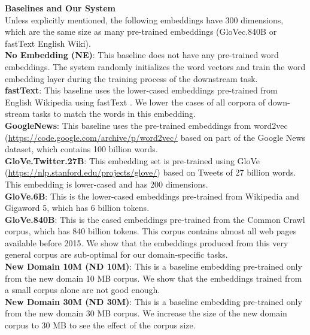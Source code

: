 \textbf{Baselines and Our System}\\
Unless explicitly mentioned, the following embeddings have 300 dimensions, which are the same size as many pre-trained embeddings (GloVec.840B \cite{pennington2014glove} or fastText English Wiki\cite{bojanowski2016enriching}).\\
\textbf{No Embedding (NE)}: This baseline does not have any pre-trained word embeddings. The system randomly initializes the word vectors and train the word embedding layer during the training process of the downstream task.
\\
\textbf{fastText}: This baseline uses the lower-cased embeddings pre-trained from English Wikipedia using fastText \cite{bojanowski2016enriching}. We lower the cases of all corpora of down-stream tasks to match the words in this embedding. \\
\textbf{GoogleNews}: This baseline uses the pre-trained embeddings from word2vec (\url{https://code.google.com/archive/p/word2vec/} based on part of the Google News dataset, which contains 100 billion words.\\
\textbf{GloVe.Twitter.27B}: This embedding set is pre-trained using GloVe (\url{https://nlp.stanford.edu/projects/glove/}) based on Tweets of 27 billion words. This embedding is lower-cased and has 200 dimensions.\\
\textbf{GloVe.6B}: This is the lower-cased embeddings pre-trained from Wikipedia and Gigaword 5, which has 6 billion tokens. \\
\textbf{GloVe.840B}: This is the cased embeddings pre-trained from the Common Crawl corpus, which has 840 billion tokens.
This corpus contains almost all web pages available before 2015. 
We show that the embeddings produced from this very general corpus are sub-optimal for our domain-specific tasks.\\
\textbf{New Domain 10M (ND 10M)}: This is a baseline embedding pre-trained only from the new domain 10 MB corpus. 
We show that the embeddings trained from a small corpus alone are not good enough.\\
\textbf{New Domain 30M (ND 30M)}: This is a baseline embedding pre-trained only from the new domain 30 MB corpus. We increase the size of the new domain corpus to 30 MB to see the effect of the corpus size. \\
